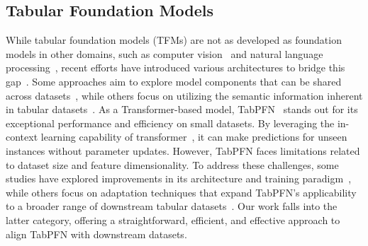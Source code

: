 \subsection{Tabular Foundation Models}
While tabular foundation models (TFMs) are not as developed as foundation models in other domains, such as computer vision~\cite{SahariaCSLWDGLA22Diffusion} and natural language processing~\cite{BrownGPT3}, recent efforts have introduced various architectures to bridge this gap~\cite{WhyTFM}. Some approaches aim to explore model components that can be shared across datasets~\cite{LiuDEN,zhu2023xtab}, while others focus on utilizing the semantic information inherent in tabular datasets~\cite{Wang2022TransTab,YanTpBerta,Tabular_8B}.
As a Transformer-based model, TabPFN~\cite{Hollmann2022TabPFN,hollmann2025tabpfn} stands out for its exceptional performance and efficiency on small datasets. By leveraging the in-context learning capability of transformer~\cite{BrownGPT3}, it can make predictions for unseen instances without parameter updates. However, TabPFN faces limitations related to dataset size and feature dimensionality. To address these challenges, some studies have explored improvements in its architecture and training paradigm~\cite{TabForestPFN,MaTabDPT}, while others focus on adaptation techniques that expand TabPFN's applicability to a broader range of downstream tabular datasets~\cite{TuneTables,LocalPFN}.
Our work falls into the latter category, offering a straightforward, efficient, and effective approach to align TabPFN with downstream datasets.


